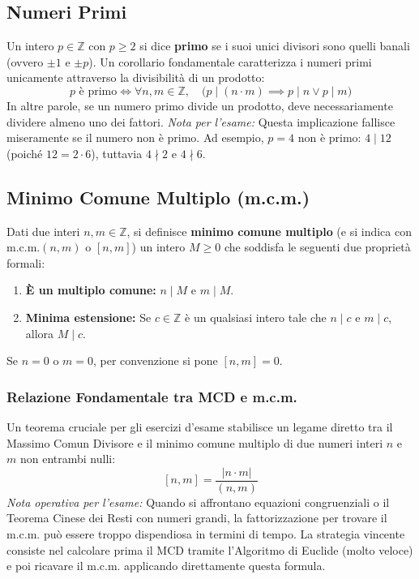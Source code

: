 \documentclass[12pt, a4paper]{article}
\begin{document}
\subsection{Numeri Primi}
Un intero $p \in \mathbb{Z}$ con $p \ge 2$ si dice \textbf{primo} se i suoi unici divisori sono quelli banali (ovvero $\pm 1$ e $\pm p$).
Un corollario fondamentale caratterizza i numeri primi unicamente attraverso la divisibilità di un prodotto:
\[ p \text{ è primo} \iff \forall n, m \in \mathbb{Z}, \quad \big(p \mid (n \cdot m) \implies p \mid n \lor p \mid m \big) \]
In altre parole, se un numero primo divide un prodotto, deve necessariamente dividere almeno uno dei fattori. 
\emph{Nota per l'esame:} Questa implicazione fallisce miseramente se il numero non è primo. Ad esempio, $p = 4$ non è primo: $4 \mid 12$ (poiché $12 = 2 \cdot 6$), tuttavia $4 \nmid 2$ e $4 \nmid 6$.

\subsection{Minimo Comune Multiplo (m.c.m.)}
Dati due interi $n, m \in \mathbb{Z}$, si definisce \textbf{minimo comune multiplo} (e si indica con $\text{m.c.m.}(n, m)$ o $[n, m]$) un intero $M \ge 0$ che soddisfa le seguenti due proprietà formali:
\begin{enumerate}
    \item \textbf{È un multiplo comune:} $n \mid M$ e $m \mid M$.
    \item \textbf{Minima estensione:} Se $c \in \mathbb{Z}$ è un qualsiasi intero tale che $n \mid c$ e $m \mid c$, allora $M \mid c$.
\end{enumerate}
Se $n = 0$ o $m = 0$, per convenzione si pone $[n, m] = 0$.

\subsubsection*{Relazione Fondamentale tra MCD e m.c.m.}
Un teorema cruciale per gli esercizi d'esame stabilisce un legame diretto tra il Massimo Comun Divisore e il minimo comune multiplo di due numeri interi $n$ e $m$ non entrambi nulli:
\[ [n, m] = \frac{|n \cdot m|}{(n, m)} \]
\emph{Nota operativa per l'esame:} Quando si affrontano equazioni congruenziali o il Teorema Cinese dei Resti con numeri grandi, la fattorizzazione per trovare il m.c.m. può essere troppo dispendiosa in termini di tempo. La strategia vincente consiste nel calcolare prima il MCD tramite l'Algoritmo di Euclide (molto veloce) e poi ricavare il m.c.m. applicando direttamente questa formula.
\end{document}
